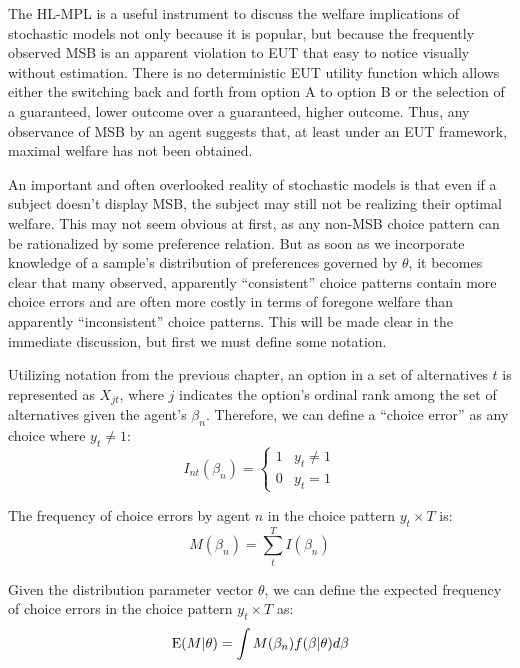 \documentclass[../main.tex]{subfiles}
\begin{document}
The HL-MPL is a useful instrument to discuss the welfare implications of stochastic models not only because it is popular, but because the frequently observed MSB is an apparent violation to EUT that easy to notice visually without estimation.
There is no deterministic EUT utility function which allows either the switching back and forth from option A to option B or the selection of a guaranteed, lower outcome over a guaranteed, higher outcome.
Thus, any observance of MSB by an agent suggests that, at least under an EUT framework, maximal welfare has not been obtained.

An important and often overlooked reality of stochastic models is that even if a subject doesn't display MSB, the subject may still not be realizing their optimal welfare.
This may not seem obvious at first, as any non-MSB choice pattern can be rationalized by some preference relation.
But as soon as we incorporate knowledge of a sample's distribution of preferences governed by $\theta$, it becomes clear that many observed, apparently \enquote{consistent} choice patterns contain more choice errors and are often more costly in terms of foregone welfare than apparently \enquote{inconsistent} choice patterns.
This will be made clear in the immediate discussion, but first we must define some notation.

Utilizing notation from the previous chapter, an option in a set of alternatives $t$ is represented as $X_{jt}$, where $j$ indicates the option's ordinal rank among the set of alternatives given the agent's $\beta_n$.
Therefore, we can define a \enquote{choice error} as any choice where $y_t \neq 1$:
\begin{equation}
	I_{nt}(\beta_n) = 
	\begin{cases}
		 1 & y_t \neq 1\\
		 0 & y_t = 1
	\end{cases}
\end{equation}

\noindent The frequency of choice errors by agent $n$ in the choice pattern $y_t \times T$ is:
\begin{equation}
	\label{eq:MBn}
	M(\beta_n) = \sum_t^T I(\beta_n)
\end{equation}

Given the distribution parameter vector $\theta$, we can define the expected frequency of choice errors in the choice pattern $y_t \times T$ as:
\begin{equation}
	\label{eq:EMt}
	\operatorname{E}(M | \theta) = \int M(\beta_n) f(\beta | \theta) d\beta
\end{equation}
\end{document}

